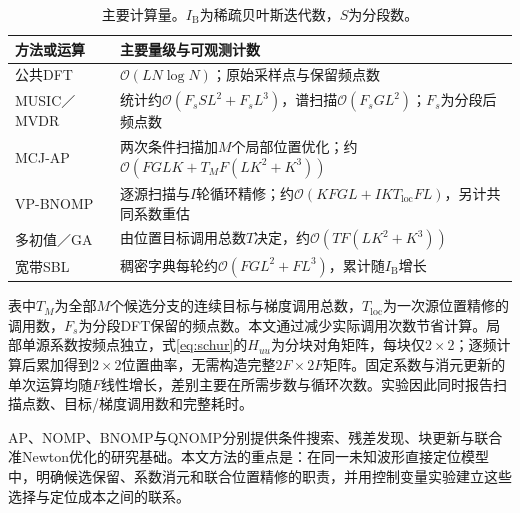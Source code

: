 \begin{table}[htbp]
\centering\small
\caption{主要计算量。$I_{\mathrm B}$为稀疏贝叶斯迭代数，$S$为分段数。}\label{tab:complexity}
\begin{tabularx}{\linewidth}{@{}lX@{}}\toprule
方法或运算 & 主要量级与可观测计数\\\midrule
公共DFT & $\mathcal O(LN\log N)$；原始采样点与保留频点数\\
MUSIC／MVDR & 统计约$\mathcal O(F_sSL^2+F_sL^3)$，谱扫描$\mathcal O(F_sGL^2)$；$F_s$为分段后频点数\\
MCJ-AP & 两次条件扫描加$M$个局部位置优化；约$\mathcal O(FGLK+T_MF(LK^2+K^3))$\\
VP-BNOMP & 逐源扫描与$I$轮循环精修；约$\mathcal O(KFGL+IKT_{\mathrm{loc}}FL)$，另计共同系数重估\\
多初值／GA & 由位置目标调用总数$T$决定，约$\mathcal O(TF(LK^2+K^3))$\\
宽带SBL & 稠密字典每轮约$\mathcal O(FGL^2+FL^3)$，累计随$I_{\mathrm B}$增长\\\bottomrule
\end{tabularx}
\end{table}
表中$T_M$为全部$M$个候选分支的连续目标与梯度调用总数，$T_{\mathrm{loc}}$为一次源位置精修的调用数，$F_s$为分段DFT保留的频点数。本文通过减少实际调用次数节省计算。局部单源系数按频点独立，式\eqref{eq:schur}的$H_{uu}$为分块对角矩阵，每块仅$2\times2$；逐频计算后累加得到$2\times2$位置曲率，无需构造完整$2F\times2F$矩阵。固定系数与消元更新的单次运算均随$F$线性增长，差别主要在所需步数与循环次数。实验因此同时报告扫描点数、目标/梯度调用数和完整耗时。

AP、NOMP、BNOMP与QNOMP分别提供条件搜索、残差发现、块更新与联合准Newton优化的研究基础\cite{ChenHudsonYao2002,Mamandipoor2016,Yang2022,Zeng2025}。本文方法的重点是：在同一未知波形直接定位模型中，明确候选保留、系数消元和联合位置精修的职责，并用控制变量实验建立这些选择与定位成本之间的联系。
